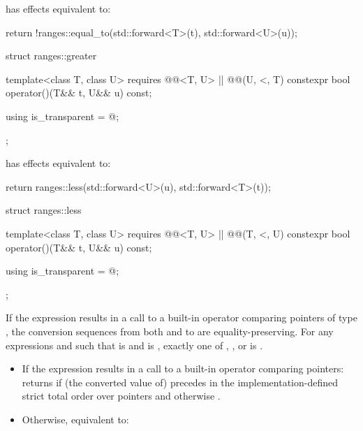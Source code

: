 \begin{itemdescr}
\pnum
{} has effects equivalent to:
\begin{codeblock}
return !ranges::equal_to{}(std::forward<T>(t), std::forward<U>(u));
\end{codeblock}
\end{itemdescr}

%
\begin{itemdecl}
struct ranges::greater {
  template<class T, class U>
    requires @@<T, U> || @@(U, <, T)
  constexpr bool operator()(T&& t, U&& u) const;

  using is_transparent = @\unspecnc@;
};
\end{itemdecl}

\begin{itemdescr}
\pnum
{} has effects equivalent to:
\begin{codeblock}
return ranges::less{}(std::forward<U>(u), std::forward<T>(t));
\end{codeblock}
\end{itemdescr}

%
\begin{itemdecl}
struct ranges::less {
  template<class T, class U>
    requires @@<T, U> || @@(T, <, U)
    constexpr bool operator()(T&& t, U&& u) const;

  using is_transparent = @\unspecnc@;
};
\end{itemdecl}

\begin{itemdescr}
\pnum
\expects
If the expression  results in a
call to a built-in operator \tcode{<} comparing pointers of type , the
conversion sequences from both  and  to  are
equality-preserving. For any expressions
 and  such that  is  and
 is , exactly one of
,
, or
is .

\pnum
\effects
\begin{itemize}
\item
If the expression  results in a
call to a built-in operator \tcode{<} comparing pointers:
returns  if (the converted value of)  precedes  in
the implementation-defined strict total order over pointers
and otherwise .

\item
Otherwise, equivalent to:
\end{itemize}
\end{itemdescr}

